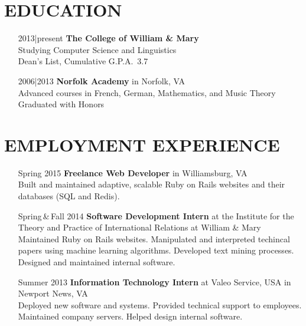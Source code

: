 \documentclass{res}     %
\begin{document}
\begin{resume}

\section{EDUCATION}          
\vspace{5mm}
\begin{itemize}[font=\itshape,align=parleft,labelwidth=3cm,leftmargin=2cm]
    \item[2013|present]
        \textbf{The College of William \& Mary}
        \\ Studying Computer Science and Linguistics %
        \\ Dean's List, Cumulative G.P.A.\ 3.7
    \item[2006|2013]
        \textbf{Norfolk Academy} in Norfolk, VA
        \\ Advanced courses in French, German, Mathematics, and Music Theory
        \\ Graduated with Honors
\end{itemize}

\section{EMPLOYMENT EXPERIENCE}
\vspace{5mm}
\begin{itemize}[font=\itshape,align=parleft,labelwidth=3cm,leftmargin=2cm]
    \item[Spring 2015]
        \textbf{Freelance Web Developer}
        in Williamsburg, VA
        \vspace{1mm} \\
        Built and maintained adaptive, scalable Ruby on Rails websites and their databases (SQL and Redis).
    \item[Spring\,\&\,Fall 2014]
        \textbf{Software Development Intern}
        at the Institute for the Theory and Practice of International Relations
        at William \& Mary
        \vspace{1mm} \\
        Maintained Ruby on Rails websites.
        Manipulated and interpreted techincal papers using machine learning algorithms.
        Developed text mining processes.
        Designed and maintained internal software.
    \item[Summer 2013]
        \textbf{Information Technology Intern}
        at Valeo Service, USA
        in Newport News, VA
        \vspace{1mm} \\
        Deployed new software and systems.
        Provided technical support to employees.
        Maintained company servers.
        Helped design internal software.
\end{itemize}


\end{resume}
\end{document}
